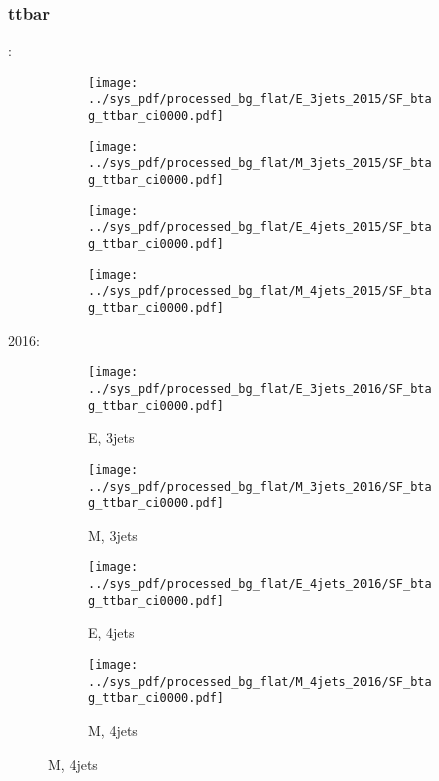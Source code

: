 \documentclass{beamer}
\begin{document}
\begin{frame}
\frametitle{ttbar}
\fontsize{5}{1}:
\begin{figure}
\centering
\begin{subfigure}[b]{0.24\textwidth}
\texttt{[image: ../sys\_pdf/processed\_bg\_flat/E\_3jets\_2015/SF\_btag\_ttbar\_ci0000.pdf]}
\end{subfigure}
\begin{subfigure}[b]{0.24\textwidth}
\texttt{[image: ../sys\_pdf/processed\_bg\_flat/M\_3jets\_2015/SF\_btag\_ttbar\_ci0000.pdf]}
\end{subfigure}
\begin{subfigure}[b]{0.24\textwidth}
\texttt{[image: ../sys\_pdf/processed\_bg\_flat/E\_4jets\_2015/SF\_btag\_ttbar\_ci0000.pdf]}
\end{subfigure}
\begin{subfigure}[b]{0.24\textwidth}
\texttt{[image: ../sys\_pdf/processed\_bg\_flat/M\_4jets\_2015/SF\_btag\_ttbar\_ci0000.pdf]}
\end{subfigure}
\end{figure}
2016:
\begin{figure}
\centering
\begin{subfigure}[b]{0.24\textwidth}
\texttt{[image: ../sys\_pdf/processed\_bg\_flat/E\_3jets\_2016/SF\_btag\_ttbar\_ci0000.pdf]}
\captionsetup{font=tiny}
\caption{E, 3jets}
\end{subfigure}
\begin{subfigure}[b]{0.24\textwidth}
\texttt{[image: ../sys\_pdf/processed\_bg\_flat/M\_3jets\_2016/SF\_btag\_ttbar\_ci0000.pdf]}
\captionsetup{font=tiny}
\caption{M, 3jets}
\end{subfigure}
\begin{subfigure}[b]{0.24\textwidth}
\texttt{[image: ../sys\_pdf/processed\_bg\_flat/E\_4jets\_2016/SF\_btag\_ttbar\_ci0000.pdf]}
\captionsetup{font=tiny}
\caption{E, 4jets}
\end{subfigure}
\begin{subfigure}[b]{0.24\textwidth}
\texttt{[image: ../sys\_pdf/processed\_bg\_flat/M\_4jets\_2016/SF\_btag\_ttbar\_ci0000.pdf]}
\captionsetup{font=tiny}
\caption{M, 4jets}
\end{subfigure}
\end{figure}
\end{frame}
\end{document}
